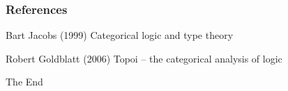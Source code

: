 \documentclass{beamer}
\begin{document}

\begin{frame}
\frametitle{References}
\footnotesize{
\begin{thebibliography}{99} %
\bibitem[]{} Bart Jacobs (1999)
\newblock Categorical logic and type theory

\bibitem[]{} Robert Goldblatt (2006)
\newblock Topoi -- the categorical analysis of logic

\end{thebibliography}
}
\end{frame}

\begin{frame}
\Huge{\centerline{The End}}
\end{frame}
\end{document}
